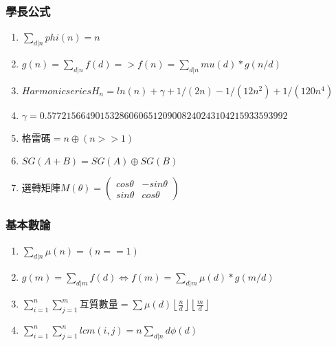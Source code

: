 \subsubsection{學長公式}
\begin{enumerate}\itemsep = -4pt
\item $\sum_{d|n} phi(n) = n$
\item $g(n) = \sum_{d|n} f(d) => f(n) = \sum_{d|n} mu(d)*g(n/d)$
\item $Harmonic series H_n = ln(n) + \gamma + 1/(2n) - 1/(12n^2) + 1/(120n^4)$
\item $ \gamma = 0.57721566490153286060651209008240243104215933593992$
\item 格雷碼$=n\oplus (n>>1)$
\item $SG(A+B)=SG(A)\oplus SG(B)$
\item 選轉矩陣$M(\theta)= \left( \begin{array}{ccc}
cos\theta & -sin\theta \\ 
sin\theta &  cos\theta
\end{array} \right)$
\end{enumerate}

\subsubsection{基本數論}
\begin{enumerate}\itemsep = -4pt
	\item $\sum_{d|n} \mu (n)=(n==1)$
	\item $g(m)=\sum_{d|m}f(d)\Leftrightarrow f(m)=\sum_{d|m}\mu (d)*g(m/d)$
	\item $\sum_{i=1}^n\sum_{j=1}^m$互質數量$=\sum \mu (d)\left \lfloor \frac{n}{d} \right \rfloor \left \lfloor \frac{m}{d} \right \rfloor$
	\item $\sum_{i=1}^n\sum_{j=1}^nlcm(i,j)=n\sum_{d|n}d\phi (d)$
\end{enumerate}

